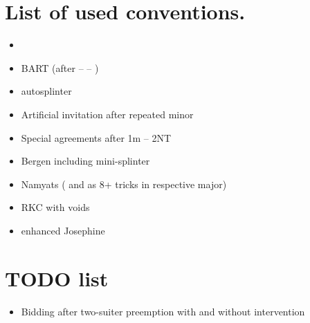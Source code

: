 \documentclass{article}
\begin{document}
  \section{List of used conventions.}
  \begin{itemize}
    \item 
    \item BART (after  --  -- )
    \item autosplinter
    \item Artificial invitation after repeated minor
    \item Special agreements after 1m -- 2NT
    \item Bergen including mini-splinter
    \item Namyats ( and  as 8+ tricks in respective major)
    \item RKC with voids
    \item enhanced Josephine 
  \end{itemize}

  \section{TODO list}
  \begin{itemize}
    \item Bidding after two-suiter preemption with and without intervention
  \end{itemize}
\end{document}
